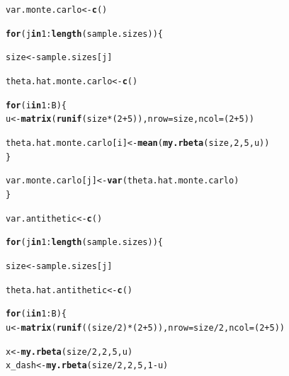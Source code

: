 \documentclass[11pt, a4paper]{article}\usepackage[]{graphicx}\usepackage[]{xcolor}
\makeatletter
\newcommand{\hlnum}[1]{\textcolor[rgb]{0.686,0.059,0.569}{#1}}%
\newcommand{\hlopt}[1]{\textcolor[rgb]{0,0,0}{#1}}%
\newcommand{\hldef}[1]{\textcolor[rgb]{0.345,0.345,0.345}{#1}}%
\newcommand{\hlkwa}[1]{\textcolor[rgb]{0.161,0.373,0.58}{\textbf{#1}}}%
\newcommand{\hlkwb}[1]{\textcolor[rgb]{0.69,0.353,0.396}{#1}}%
\newcommand{\hlkwc}[1]{\textcolor[rgb]{0.333,0.667,0.333}{#1}}%
\newcommand{\hlkwd}[1]{\textcolor[rgb]{0.737,0.353,0.396}{\textbf{#1}}}%
\newenvironment{kframe}{%
 \def\at@end@of@kframe{}%
 \ifinner\ifhmode%
  \def\at@end@of@kframe{\end{minipage}}%
  \begin{minipage}{\columnwidth}%
 \fi\fi%
 \def\FrameCommand##1{\hskip\@totalleftmargin \hskip-\fboxsep
 \colorbox{shadecolor}{##1}\hskip-\fboxsep
     \hskip-\linewidth \hskip-\@totalleftmargin \hskip\columnwidth}%
 \MakeFramed {\advance\hsize-\width
   \@totalleftmargin\z@ \linewidth\hsize
   \@setminipage}}%
 {\par\unskip\endMakeFramed%
 \at@end@of@kframe}
\newenvironment{knitrout}{}{} %
\makeatother
\begin{document}
\begin{enumerate}
\begin{knitrout}
\color{fgcolor}\begin{kframe}
\begin{alltt}
\hldef{var.monte.carlo} \hlkwb{<-} \hlkwd{c}\hldef{()}

\hlkwa{for} \hldef{(j} \hlkwa{in} \hlnum{1}\hlopt{:}\hlkwd{length}\hldef{(sample.sizes)) \{}

  \hldef{size} \hlkwb{<-} \hldef{sample.sizes[j]}

  \hldef{theta.hat.monte.carlo} \hlkwb{<-} \hlkwd{c}\hldef{()}

  \hlkwa{for} \hldef{(i} \hlkwa{in} \hlnum{1}\hlopt{:}\hldef{B) \{}
    \hldef{u} \hlkwb{<-} \hlkwd{matrix}\hldef{(}\hlkwd{runif}\hldef{(size} \hlopt{*} \hldef{(}\hlnum{2} \hlopt{+} \hlnum{5}\hldef{)),} \hlkwc{nrow} \hldef{= size,} \hlkwc{ncol} \hldef{= (}\hlnum{2} \hlopt{+} \hlnum{5}\hldef{))}

    \hldef{theta.hat.monte.carlo[i]} \hlkwb{<-} \hlkwd{mean}\hldef{(}\hlkwd{my.rbeta}\hldef{(size,} \hlnum{2}\hldef{,} \hlnum{5}\hldef{, u))}
  \hldef{\}}

  \hldef{var.monte.carlo[j]} \hlkwb{<-} \hlkwd{var}\hldef{(theta.hat.monte.carlo)}
\hldef{\}}
\end{alltt}
\end{kframe}
\end{knitrout}

\begin{knitrout}
\color{fgcolor}\begin{kframe}
\begin{alltt}
\hldef{var.antithetic} \hlkwb{<-} \hlkwd{c}\hldef{()}

\hlkwa{for} \hldef{(j} \hlkwa{in} \hlnum{1}\hlopt{:}\hlkwd{length}\hldef{(sample.sizes)) \{}

  \hldef{size} \hlkwb{<-} \hldef{sample.sizes[j]}

  \hldef{theta.hat.antithetic} \hlkwb{<-} \hlkwd{c}\hldef{()}

  \hlkwa{for} \hldef{(i} \hlkwa{in} \hlnum{1}\hlopt{:}\hldef{B) \{}
    \hldef{u} \hlkwb{<-} \hlkwd{matrix}\hldef{(}\hlkwd{runif}\hldef{((size} \hlopt{/} \hlnum{2}\hldef{)} \hlopt{*} \hldef{(}\hlnum{2} \hlopt{+} \hlnum{5}\hldef{)),} \hlkwc{nrow} \hldef{= size} \hlopt{/} \hlnum{2}\hldef{,} \hlkwc{ncol} \hldef{= (}\hlnum{2} \hlopt{+} \hlnum{5}\hldef{))}

    \hldef{x} \hlkwb{<-} \hlkwd{my.rbeta}\hldef{(size} \hlopt{/} \hlnum{2}\hldef{,} \hlnum{2}\hldef{,} \hlnum{5}\hldef{, u)}
    \hldef{x_dash} \hlkwb{<-} \hlkwd{my.rbeta}\hldef{(size} \hlopt{/} \hlnum{2}\hldef{,} \hlnum{2}\hldef{,} \hlnum{5}\hldef{,} \hlnum{1}\hlopt{-}\hldef{u)}


\end{alltt}
\end{kframe}
\end{knitrout}
\end{enumerate}
\end{document}
